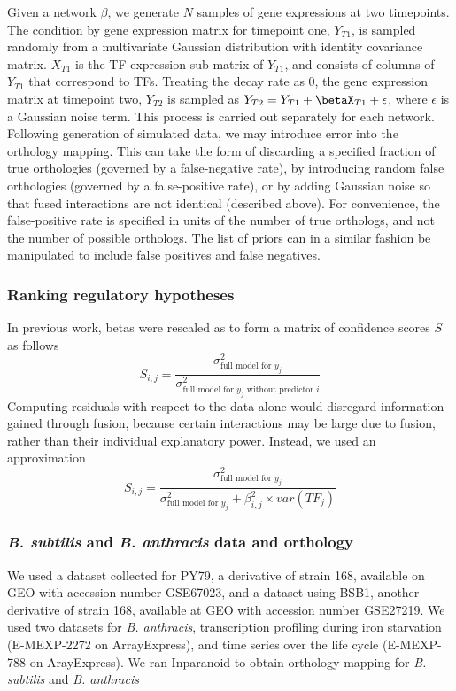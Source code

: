 \documentclass[11pt]{article}
\begin{document}
Given a network $\beta$, we generate $N$ samples of gene expressions at two timepoints. 
The condition by gene expression matrix for timepoint one, $Y_{T1}$, is sampled randomly from a multivariate Gaussian distribution with identity covariance matrix. $X_{T1}$ is the TF expression sub-matrix of $Y_{T1}$, and consists of columns of $Y_{T1}$ that correspond to TFs. 
Treating the decay rate as 0, the gene expression matrix at timepoint two, $Y_{T2}$ is sampled as $Y_{T2} = Y_{T1} + \betaX_{T1} + \epsilon$, where $\epsilon$ is a Gaussian noise term. 
This process is carried out separately for each network. 
Following generation of simulated data, we may introduce error into the orthology mapping. 
This can take the form of discarding a specified fraction of true orthologies (governed by a false-negative rate), by introducing random false orthologies (governed by a false-positive rate), or by adding Gaussian noise so that fused interactions are not identical (described above). 
For convenience, the false-positive rate is specified in units of the number of true orthologs, and not the number of possible orthologs. 
The list of priors can in a similar fashion be manipulated to include false positives and false negatives. 

\subsubsection{Ranking regulatory hypotheses}
In previous work, betas were rescaled as to form a matrix of confidence scores $S$ as follows
\begin{equation}
S_{i,j} = \frac{\sigma^2_{\text{full model for }y_j}}{\sigma^2_{\text{full model for }y_j \text{ without predictor }i}}
\end{equation}
Computing residuals with respect to the data alone would disregard information gained through fusion, because certain interactions may be large due to fusion, rather than their individual explanatory power. Instead, we used an approximation
\begin{equation}
S_{i,j} = \frac{\sigma^2_{\text{full model for }y_j}}{\sigma^2_{\text{full model for }y_j} + \beta_{i,j}^2 \times var(TF_j)}
\end{equation}

\subsubsection{\textit{B. subtilis} and \textit{B. anthracis} data and orthology}
We used a dataset collected for PY79, a derivative of strain 168, available on GEO with accession number GSE67023, and a dataset using BSB1, another derivative of strain 168, available at GEO with accession number GSE27219. 
We used two datasets for \textit{B. anthracis}, transcription profiling during iron starvation (E-MEXP-2272 on ArrayExpress), and time series over the life cycle (E-MEXP-788 on ArayExpress). We ran Inparanoid to obtain orthology mapping for \textit{B. subtilis} and \textit{B. anthracis} \cite{ostlund_inparanoid_2010}
\end{document}

